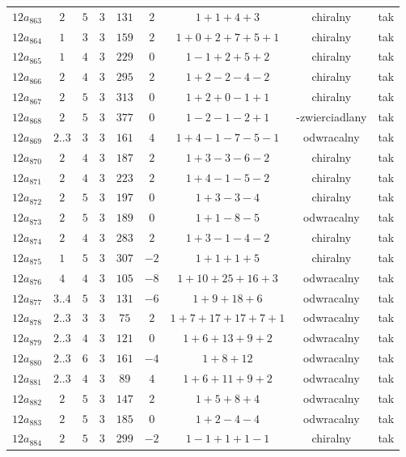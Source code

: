 \begin{longtable}{ccccccccc}
$12a_{863}$ & $2$ & $5$ & $3$ & $131$ & $2$ & $1+1+4+3$ & chiralny & tak \\
$12a_{864}$ & $1$ & $3$ & $3$ & $159$ & $2$ & $1+0+2+7+5+1$ & chiralny & tak \\
$12a_{865}$ & $1$ & $4$ & $3$ & $229$ & $0$ & $1-1+2+5+2$ & chiralny & tak \\
$12a_{866}$ & $2$ & $4$ & $3$ & $295$ & $2$ & $1+2-2-4-2$ & chiralny & tak \\
$12a_{867}$ & $2$ & $5$ & $3$ & $313$ & $0$ & $1+2+0-1+1$ & chiralny & tak \\
$12a_{868}$ & $2$ & $5$ & $3$ & $377$ & $0$ & $1-2-1-2+1$ & -zwierciadlany & tak \\
$12a_{869}$ & $2..3$ & $3$ & $3$ & $161$ & $4$ & $1+4-1-7-5-1$ & odwracalny & tak \\
$12a_{870}$ & $2$ & $4$ & $3$ & $187$ & $2$ & $1+3-3-6-2$ & chiralny & tak \\
$12a_{871}$ & $2$ & $4$ & $3$ & $223$ & $2$ & $1+4-1-5-2$ & chiralny & tak \\
$12a_{872}$ & $2$ & $5$ & $3$ & $197$ & $0$ & $1+3-3-4$ & chiralny & tak \\
$12a_{873}$ & $2$ & $5$ & $3$ & $189$ & $0$ & $1+1-8-5$ & odwracalny & tak \\
$12a_{874}$ & $2$ & $4$ & $3$ & $283$ & $2$ & $1+3-1-4-2$ & chiralny & tak \\
$12a_{875}$ & $1$ & $5$ & $3$ & $307$ & $-2$ & $1+1+1+5$ & chiralny & tak \\
$12a_{876}$ & $4$ & $4$ & $3$ & $105$ & $-8$ & $1+10+25+16+3$ & odwracalny & tak \\
$12a_{877}$ & $3..4$ & $5$ & $3$ & $131$ & $-6$ & $1+9+18+6$ & odwracalny & tak \\
$12a_{878}$ & $2..3$ & $3$ & $3$ & $75$ & $2$ & $1+7+17+17+7+1$ & odwracalny & tak \\
$12a_{879}$ & $2..3$ & $4$ & $3$ & $121$ & $0$ & $1+6+13+9+2$ & odwracalny & tak \\
$12a_{880}$ & $2..3$ & $6$ & $3$ & $161$ & $-4$ & $1+8+12$ & odwracalny & tak \\
$12a_{881}$ & $2..3$ & $4$ & $3$ & $89$ & $4$ & $1+6+11+9+2$ & odwracalny & tak \\
$12a_{882}$ & $2$ & $5$ & $3$ & $147$ & $2$ & $1+5+8+4$ & odwracalny & tak \\
$12a_{883}$ & $2$ & $5$ & $3$ & $185$ & $0$ & $1+2-4-4$ & odwracalny & tak \\
$12a_{884}$ & $2$ & $5$ & $3$ & $299$ & $-2$ & $1-1+1+1-1$ & chiralny & tak \\

\end{longtable}
